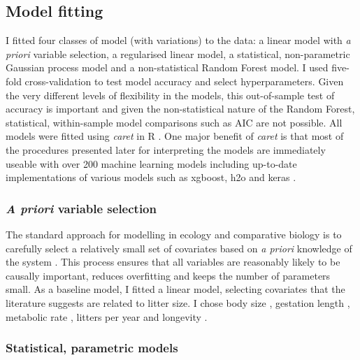 \documentclass[12pt,]{article}
\begin{document}
\subsection{Model fitting}\label{model-fitting}



I fitted four classes of model (with variations) to the data: a linear model with \emph{a priori} variable selection, a regularised linear model, a statistical, non-parametric Gaussian process model and a non-statistical Random Forest model.
I used five-fold cross-validation to test model accuracy and select hyperparameters.
Given the very different levels of flexibility in the models, this out-of-sample test of accuracy is important and given the non-statistical nature of the Random Forest, statistical, within-sample model comparisons such as AIC are not possible.
All models were fitted using \emph{caret} \citep{caret} in R \citep{R}.
One major benefit of \emph{caret} is that most of the procedures presented later for interpreting the models are immediately useable with over 200 machine learning models including up-to-date implementations of various models such as xgboost, h2o and keras \citep{xgboost, h2o, keras}.

\subsubsection{\texorpdfstring{\emph{A priori} variable selection}{A priori variable selection}}\label{a-priori-variable-selection}

The standard approach for modelling in ecology and comparative biology is to carefully select a relatively small set of covariates based on \emph{a priori} knowledge of the system \citep{whittingham2006we}.
This process ensures that all variables are reasonably likely to be causally important, reduces overfitting and keeps the number of parameters small.
As a baseline model, I fitted a linear model, selecting covariates that the literature suggests are related to litter size.
I chose body size \citep{leutenegger1979evolution, tuomi1980mammalian}, gestation length \citep{okkens1993influence, bielby2007fast}, metabolic rate \citep{white2004does}, litters per year \citep{white2004does} and longevity \citep{wilkinson2002life, zammuto1986life}.



\subsubsection{Statistical, parametric models}\label{statistical-parametric-models}
\end{document}
